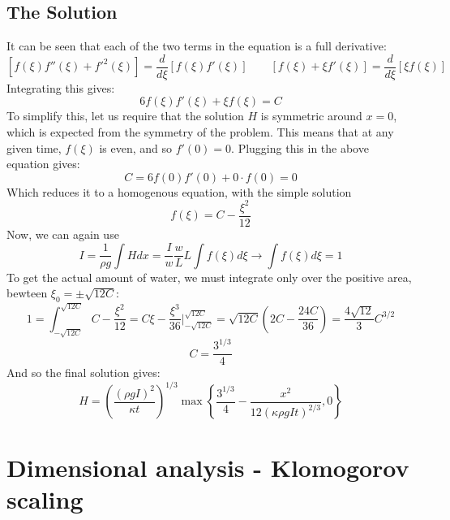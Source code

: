 \documentclass{article}
\begin{document}
\subsection{The Solution}
It can be seen that each of the two terms in the equation is a full derivative:
\begin{equation}
    \left[f(\xi)f''(\xi) + f'^2(\xi)\right] = \frac{d}{d\xi}\left[f(\xi)f'(\xi)\right]
    \qquad
    \left[f(\xi) + \xi f'(\xi)\right] = \frac{d}{d\xi}\left[\xi f(\xi)\right]
\end{equation}
Integrating this gives:
\begin{equation}
    6f(\xi)f'(\xi) + \xi f(\xi) = C
\end{equation}
To simplify this, let us require that the solution $H$ is symmetric around $x = 0$, which is expected from the symmetry of the problem. This means that at any given time, $f(\xi)$ is even, and so $f'(0) = 0$. Plugging this in the above equation gives:
\begin{equation}
    C = 6f(0)f'(0) + 0\cdot f(0) = 0
\end{equation}
Which reduces it to a homogenous equation, with the simple solution
\begin{equation}
    f(\xi) = C - \frac{\xi^2}{12}
\end{equation}
Now, we can again use
\begin{equation}
    I = \frac{1}{\rho g} \int H dx = \frac{I}{w} \frac{w}{L} L \int  f(\xi) d\xi \rightarrow \int f(\xi) d\xi = 1
\end{equation}
To get the actual amount of water, we must integrate only over the positive area, bewteen $\xi_0 = \pm \sqrt{12C}$:
\begin{equation}
    1 = \int_{-\sqrt{12C}}^{\sqrt{12C}} C - \frac{\xi^2}{12} = C\xi - \frac{\xi^3}{36}\Big|_{-\sqrt{12C}}^{\sqrt{12C}} = \sqrt{12C}\left(2C - \frac{24C}{36}\right) = \frac{4\sqrt{12}}{3}C^{3/2}
\end{equation}
\begin{equation}
    C = \frac{3^{1/3}}{4}
\end{equation}
And so the final solution gives:
\begin{equation}
    \boxed{H = \left(\frac{\left(\rho g I\right)^2}{\kappa t}\right)^{1/3} \max\left\{\frac{3^{1/3}}{4} - \frac{x^2}{12(\kappa \rho g I t)^{2/3}}, 0\right\}}
\end{equation}

\newpage
\section{Dimensional analysis - Klomogorov scaling}
\end{document}
